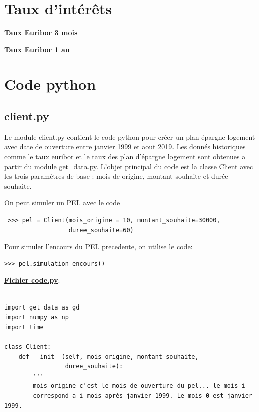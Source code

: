 \documentclass[12pt, a4paper]{book}
\begin{document}
{\chapter{Taux d'intérêts}

\begin{table}[h!]
	\caption{\bf Taux Euribor 3 mois}
	\bigskip	
	\label{eur3m}
	\centering
\end{table}

\begin{table}[h!]
	\caption{\bf Taux Euribor 1 an}
	\bigskip	
	\label{eur1a}
	\centering
\end{table}



\chapter{Code python}


\section{client.py}
\label{client.py}
Le module client.py contient le code python pour créer un plan épargne logement avec date de ouverture entre janvier 1999 et aout 2019. Les donnés historiques comme le taux euribor et le taux des plan d'épargne logement sont obtenues a partir du module get\_data.py.  L'objet principal du code est la classe Client avec les trois paramètres de base : mois de origine, montant souhaite et durée souhaite.

On peut simuler un PEL avec le code

\begin{verbatim}
 >>> pel = Client(mois_origine = 10, montant_souhaite=30000, 
 				  duree_souhaite=60)
\end{verbatim}

Pour simuler l'encours du PEL precedente, on utilise le code:

\begin{verbatim}
>>> pel.simulation_encours()
\end{verbatim}

\medskip

{\bf \underline{Fichier code.py}}:
\begin{small}
\begin{verbatim}

import get_data as gd
import numpy as np
import time

class Client:
    def __init__(self, mois_origine, montant_souhaite,
                 duree_souhaite):
        '''
        mois_origine c'est le mois de ouverture du pel... le mois i
        correspond a i mois après janvier 1999. Le mois 0 est janvier 1999.


\end{verbatim}
\end{small}}
\end{document}
